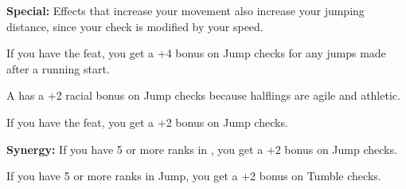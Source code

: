 \textbf{Special:} Effects that increase your movement also increase your jumping 
distance, since your check is modified by your speed.

If you have the  feat, you get a +4 bonus on Jump checks for any jumps made 
after a running start.

A  has a +2 racial bonus on Jump checks because halflings are agile and 
athletic.

If you have the  feat, you get a +2 bonus on Jump checks.

\textbf{Synergy:} If you have 5 or more ranks in , you get a +2 bonus on 
Jump checks.

If you have 5 or more ranks in Jump, you get a +2 bonus on Tumble checks.
